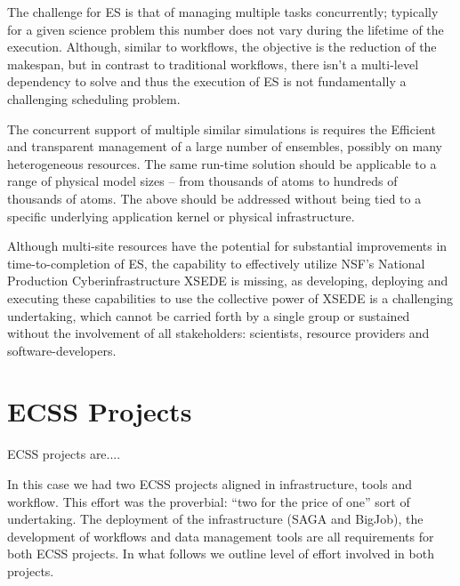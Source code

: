 \documentclass{sig-alternate}
\begin{document}


The challenge for ES is that of managing multiple tasks concurrently;
typically for a given science problem this number does not vary during
the lifetime of the execution. Although, similar to workflows, the
objective is the reduction of the makespan, but in contrast to
traditional workflows, there isn't a multi-level dependency to solve
and thus the execution of ES is not fundamentally a challenging
scheduling problem.

The concurrent support of multiple similar simulations is requires the
Efficient and transparent management of a large number of ensembles,
possibly on many heterogeneous resources. The same run-time solution
should be applicable to a range of physical model sizes -- from
thousands of atoms to hundreds of thousands of atoms.%
The above should be addressed without being tied to a specific
underlying application kernel or physical infrastructure. 
 
Although multi-site resources have the potential for substantial
improvements in time-to-completion of ES, the capability to
effectively utilize NSF's National Production Cyberinfrastructure
XSEDE is missing, as developing, deploying and executing these
capabilities to use the collective power of XSEDE is a challenging
undertaking, which cannot be carried forth by a single group or
sustained without the involvement of all stakeholders: scientists,
resource providers and software-developers.

\section{ECSS Projects}

ECSS projects are....

In this case we had two ECSS projects aligned in infrastructure, tools and
workflow. This effort was the proverbial: ``two for the price of one'' sort
of undertaking. The deployment of the infrastructure (SAGA and BigJob), the
development of workflows and data management tools are all requirements
for both ECSS projects. In what follows we outline level of effort involved
in both projects.
\end{document}
